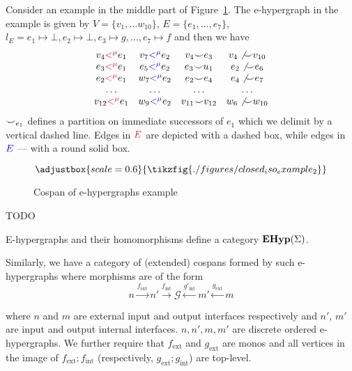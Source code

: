 Consider an example in the middle part of Figure~\ref{fig:e-cospan-example}.
The e-hypergraph in the example is given by $V = \{v_{1}, \ldots w_{10}\}$, $E = \{e_{1}, \ldots, e_{7}\}$, $l_{E} = {e_{1} \mapsto \bot, e_{2} \mapsto \bot, e_{3} \mapsto g, \ldots, e_{7} \mapsto f}$ and then we have
\[
\begin{array}{cccc}
  v_{4} \textcolor{red}{<^{\mu}} e_{1} & v_{7} \textcolor{blue}{<^{\mu}} e_{2} & v_{4} {\smile} e_{3} & v_{4} \not {\smile} v_{10}\\
  e_{3} \textcolor{red}{<^{\mu}} e_{1} & e_{5} \textcolor{blue}{<^{\mu}} e_{2} &  e_{3} {\smile} u_{1} & e_{2} \not {\smile} e_{6}\\
  e_{2} \textcolor{red}{<^{\mu}} e_{1} & w_{7} \textcolor{blue}{<^{\mu}} e_{2} & e_{2} {\smile} e_{4} & e_{4} \not {\smile} e_{7}\\  
  \ldots & \ldots & \ldots & \ldots \\
  v_{12} \textcolor{red}{<^{\mu}} e_{1} & w_{9} \textcolor{blue}{<^{\mu}} e_{2} & v_{11} {\smile} v_{12} & w_{6} \not {\smile} w_{10}
\end{array}
\]
${\smile}_{e_{1}}$ defines a partition on immediate successors of $e_{1}$ which we delimit by a vertical dashed line.
Edges in $\textcolor{red}{E}$ are depicted with a dashed box, while edges in $\textcolor{blue}{E}$ --- with a round solid box.

\begin{figure}

\[
\adjustbox{scale=0.6}{
\tikzfig{./figures/closed_iso_example_2}
}
\]
\caption{Cospan of e-hypergraphs example}
\label{fig:e-cospan-example}
\end{figure}

\begin{definition}
TODO
\end{definition}

E-hypergraphs and their homomorphisms define a category $\mathbf{EHyp}({\Sigma})$.

Similarly, we have a category of (extended) cospans formed by such e-hypergraphs where morphisms are of the form
\[
n \xrightarrow{f_{\text{ext}}} n' \xrightarrow{f_{\text{int}}} \mathcal{G} \xleftarrow{g'_{\text{int}}} m' \xleftarrow{g_{\text{ext}}} m
\]

where $n$ and $m$ are external input and output interfaces respectively and $n'$, $m'$ are input and output internal interfaces.
$n,n',m,m'$ are discrete ordered e-hypergraphs.
We further require that $f_{\text{ext}}$ and $g_{\text{ext}}$ are monos and all vertices in the image of $f_{\text{ext}};f_{\text{int}}$ (respectively, $g_{\text{ext}};g_{\text{int}}$) are top-level.

